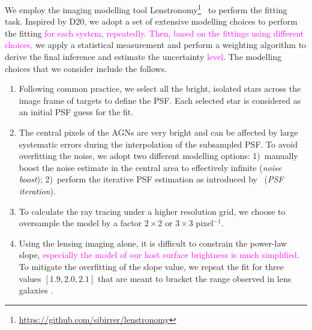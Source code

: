 \documentclass[fleqn,usenatbib]{mnras}
\newcommand{\lenstronomy}{{\sc Lenstronomy}}
\newcommand{\pink}[1]{{\textcolor{magenta}{#1}}}
\begin{document}
We employ the imaging modelling tool \lenstronomy\footnote{\url{https://github.com/sibirrer/lenstronomy}}~\citep{lenstronomy} to perform the fitting task. Inspired by D20, we adopt a set of extensive modelling choices to perform the fitting \pink{for each system, repeatedly. Then, based on the fittings using different choices,} we apply a statistical measurement and perform a weighting algorithm to derive the final inference and estimate the uncertainty \pink{level}. The modelling choices that we consider include the follows.
\begin{enumerate}
\item Following common practice, we select all the bright, isolated stars across the image frame of targets to define the PSF. Each selected star is considered as an initial PSF guess for the fit.
\item The central pixels of the AGNs are very bright and can be affected by large systematic errors during the interpolation of the subsampled PSF. To avoid overfitting the noise, we adopt two different modelling options: 1)~manually boost the noise estimate in the central area to effectively infinite ({\it noise boost}); 2)~perform the iterative PSF estimation as introduced by~\citet{Chen2016, Birrer2019} ({\it PSF iteration}).
\item To calculate the ray tracing under a higher resolution grid, we choose to oversample the model by a factor  $2\times2$ or $3\times3$ pixel$^{-1}$.
\item Using the lensing imaging alone, it is difficult to constrain the power-law slope, \pink{especially the model of our host surface brightness is much simplified}. To mitigate the overfitting of the slope value, we repeat the fit for three values $[1.9, 2.0, 2.1]$ that are meant to bracket the range observed in lens galaxies \citep[e.g.,][]{Auger2010}.
\end{enumerate}
\end{document}
